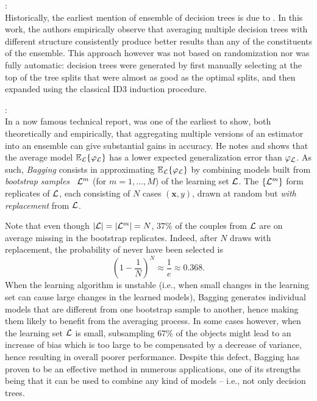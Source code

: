 \begin{description}

\item \citet{kwok:1990}: \hfill \\
    Historically, the earliest mention of ensemble of decision trees is due to
    \citet{kwok:1990}. In this work, the authors empirically observe that
    averaging multiple decision trees with different structure consistently
    produce better results than any of the constituents of the ensemble. This
    approach however was not based on randomization nor was fully automatic:
    decision trees were generated by first manually selecting at the top of the
    tree splits that were almost as good as the optimal splits, and then
    expanded using the classical ID3 induction procedure.

\item \citet{breiman:1996b}: \hfill \\
    In a now famous technical report, \citet{breiman:1996b} was one of the earliest to
    show, both theoretically and empirically, that aggregating multiple
    versions of an estimator into an ensemble can give substantial gains in
    accuracy. He notes and shows that the average model $\mathbb{E}_{\cal L}\{
    \varphi_{\cal L} \}$ has a lower expected generalization error than
    $\varphi_{\cal L}$. As such, \textit{Bagging}  consists in
    approximating $\mathbb{E}_{\cal L}\{ \varphi_{\cal L} \}$  by combining
    models built from \textit{bootstrap samples}~\citep{efron:1979} ${\cal
    L}^m$ (for $m=1,\dots,M$) of the learning set ${\cal L}$. The $\{ {\cal
    L}^m \}$ form replicates of ${\cal L}$, each consisting of $N$ cases $(\mathbf{x},y)$, drawn
    at random but \textit{with replacement} from ${\cal L}$.

    Note that even
    though $|{\cal L}|=|{\cal L}^m|=N$, $37\%$ of the couples from ${\cal L}$
    are on average missing in the bootstrap replicates. Indeed, after $N$ draws
    with replacement, the probability of never have been selected is
    \begin{equation}
    (1 - \frac{1}{N})^N \approx \frac{1}{e} \approx 0.368.
    \end{equation}
    When the learning algorithm is unstable (i.e., when small changes in the
    learning set can cause large changes in the learned models), Bagging
    generates individual models that are  different from one bootstrap sample
    to another, hence making them likely to benefit from the averaging process.
    In some cases however, when the learning set ${\cal L}$ is small,
    subsampling $67\%$ of the objects might lead to an increase of bias which
    is too large to be compensated by a decrease of variance, hence resulting
    in overall poorer performance. Despite this defect, Bagging has proven to
    be an effective method in numerous applications, one of its strengths being
    that it can be used to combine any kind of models -- i.e., not only
    decision trees.


\end{description}
